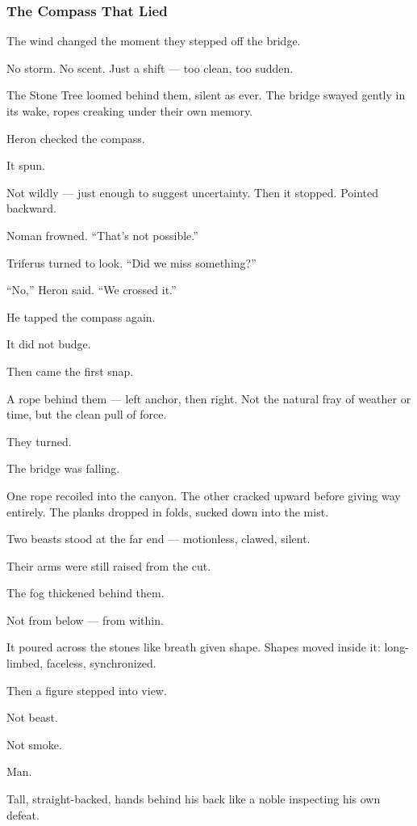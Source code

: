 \documentclass[12pt]{article}
\begin{document}
\subsubsection{The Compass That Lied}

The wind changed the moment they stepped off the bridge.

No storm. No scent. Just a shift — too clean, too sudden.

The Stone Tree loomed behind them, silent as ever. The bridge swayed gently in its wake, ropes creaking under their own memory.

Heron checked the compass.

It spun.

Not wildly — just enough to suggest uncertainty. Then it stopped. Pointed backward.

Noman frowned. “That’s not possible.”

Triferus turned to look. “Did we miss something?”

“No,” Heron said. “We crossed it.”

He tapped the compass again.

It did not budge.

Then came the first snap.

A rope behind them — left anchor, then right. Not the natural fray of weather or time, but the clean pull of force.

They turned.

The bridge was falling.

One rope recoiled into the canyon. The other cracked upward before giving way entirely. The planks dropped in folds, sucked down into the mist.

Two beasts stood at the far end — motionless, clawed, silent.

Their arms were still raised from the cut.

\bigskip

The fog thickened behind them.

Not from below — from within.

It poured across the stones like breath given shape. Shapes moved inside it: long-limbed, faceless, synchronized.

Then a figure stepped into view.

Not beast.

Not smoke.

Man.

Tall, straight-backed, hands behind his back like a noble inspecting his own defeat.
\end{document}
